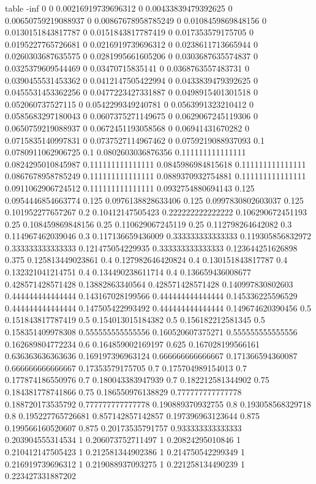 table {%
-inf 0
0 0.00216919739696312
0 0.00433839479392625
0 0.00650759219088937
0 0.00867678958785249
0 0.0108459869848156
0 0.0130151843817787
0 0.0151843817787419
0 0.017353579175705
0 0.0195227765726681
0 0.0216919739696312
0 0.0238611713665944
0 0.0260303687635575
0 0.0281995661605206
0 0.0303687635574837
0 0.0325379609544469
0 0.03470715835141
0 0.0368763557483731
0 0.0390455531453362
0 0.0412147505422994
0 0.0433839479392625
0 0.0455531453362256
0 0.0477223427331887
0 0.0498915401301518
0 0.052060737527115
0 0.0542299349240781
0 0.0563991323210412
0 0.0585683297180043
0 0.0607375271149675
0 0.0629067245119306
0 0.0650759219088937
0 0.0672451193058568
0 0.06941431670282
0 0.0715835140997831
0 0.0737527114967462
0 0.0759219088937093
0.1 0.0780911062906725
0.1 0.0802603036876356
0.111111111111111 0.0824295010845987
0.111111111111111 0.0845986984815618
0.111111111111111 0.0867678958785249
0.111111111111111 0.0889370932754881
0.111111111111111 0.0911062906724512
0.111111111111111 0.0932754880694143
0.125 0.0954446854663774
0.125 0.0976138828633406
0.125 0.0997830802603037
0.125 0.101952277657267
0.2 0.10412147505423
0.222222222222222 0.106290672451193
0.25 0.108459869848156
0.25 0.110629067245119
0.25 0.112798264642082
0.3 0.114967462039046
0.3 0.117136659436009
0.333333333333333 0.119305856832972
0.333333333333333 0.121475054229935
0.333333333333333 0.123644251626898
0.375 0.125813449023861
0.4 0.127982646420824
0.4 0.130151843817787
0.4 0.132321041214751
0.4 0.134490238611714
0.4 0.136659436008677
0.428571428571428 0.13882863340564
0.428571428571428 0.140997830802603
0.444444444444444 0.143167028199566
0.444444444444444 0.145336225596529
0.444444444444444 0.147505422993492
0.444444444444444 0.149674620390456
0.5 0.151843817787419
0.5 0.154013015184382
0.5 0.156182212581345
0.5 0.158351409978308
0.555555555555556 0.160520607375271
0.555555555555556 0.162689804772234
0.6 0.164859002169197
0.625 0.167028199566161
0.636363636363636 0.169197396963124
0.666666666666667 0.171366594360087
0.666666666666667 0.17353579175705
0.7 0.175704989154013
0.7 0.177874186550976
0.7 0.180043383947939
0.7 0.182212581344902
0.75 0.184381778741866
0.75 0.186550976138829
0.777777777777778 0.188720173535792
0.777777777777778 0.190889370932755
0.8 0.193058568329718
0.8 0.195227765726681
0.857142857142857 0.197396963123644
0.875 0.199566160520607
0.875 0.20173535791757
0.933333333333333 0.203904555314534
1 0.206073752711497
1 0.20824295010846
1 0.210412147505423
1 0.212581344902386
1 0.214750542299349
1 0.216919739696312
1 0.219088937093275
1 0.221258134490239
1 0.223427331887202
}
